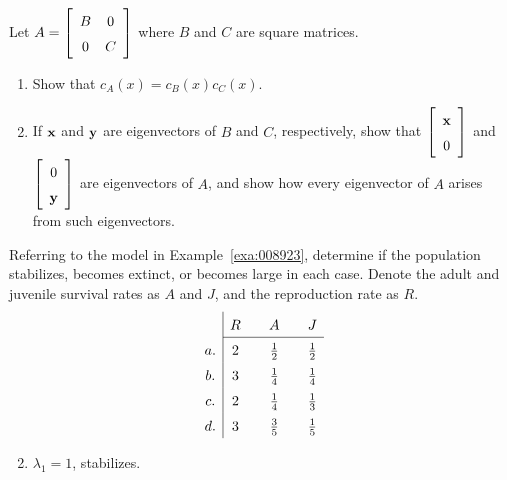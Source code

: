\begin{multicols}{2}
\begin{ex}
\begin{enumerate}[label={\alph*.}]
\end{enumerate}
\end{ex}

\begin{ex}
Let $A = \leftB \begin{array}{cc}
B & 0 \\
0 & C 
\end{array}\rightB$
 where $B$ and $C$ are square matrices.


\begin{enumerate}[label={\alph*.}]
\item Show that $c_{A}(x) = c_{B}(x)c_{C}(x)$.

\item If $\textbf{x}$ and $\textbf{y}$ are eigenvectors of $B$ and $C$, respectively, show that $\leftB \begin{array}{c}
\vect{x} \\
0
\end{array}\rightB$
 and $\leftB \begin{array}{c}
0 \\
\vect{y}
\end{array}\rightB$
 are eigenvectors of $A$, and show how every eigenvector of $A$ arises from such eigenvectors.

\end{enumerate}
\end{ex}

\begin{ex}
Referring to the model in Example~\ref{exa:008923},
 determine if the population stabilizes, becomes extinct, or becomes 
large in each case. Denote the adult and juvenile survival rates as $A$ and $J$, and the reproduction rate as $R$.
\begin{equation*}
\def\arraystretch{1.5}  \begin{array}{c|ccccc}
& R & & A & & J \\ \cline{2-6}
a. & 2 & & \frac{1}{2} & &\frac{1}{2}\\
b. & 3 & &\frac{1}{4} & &\frac{1}{4}\\
c. & 2 & &\frac{1}{4} & &\frac{1}{3}\\
d. & 3 & &\frac{3}{5} & &\frac{1}{5}
\end{array}
\end{equation*}
\begin{sol}
\begin{enumerate}[label={\alph*.}]
\setcounter{enumi}{1}
\item  $\lambda_{1} = 1$, stabilizes.


\end{enumerate}
\end{sol}
\end{ex}
\end{multicols}
